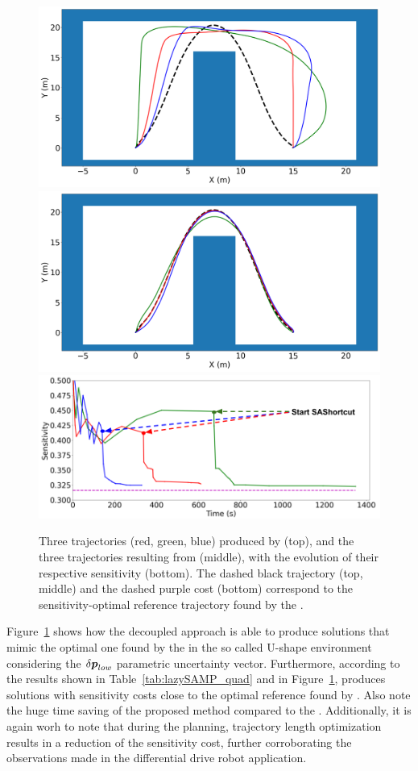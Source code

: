 \begin{figure}[h]
    \centering
    \includegraphics[width=0.7\linewidth]{figures/samp/U_shape_3in1_before.png}
    \includegraphics[width=0.7\linewidth]{figures/samp/U_shape_3in1_after.png}
    \includegraphics[width=0.7\linewidth]{figures/samp/U_shape_3in1_sensi.png}
    \caption{Three trajectories (red, green, blue) produced by  (top), and the three trajectories resulting from  (middle), with the evolution of their respective sensitivity (bottom). 
    The dashed black trajectory (top, middle) and the dashed purple cost (bottom) correspond to the sensitivity-optimal reference trajectory found by the .}
    \label{fig:U_shape}
\end{figure}

Figure~\ref{fig:U_shape} shows how the decoupled approach is able to produce solutions that mimic the optimal one found by the  in the so called U-shape environment considering the $\delta\boldsymbol{p}_{low}$ parametric uncertainty vector.
Furthermore, according to the results shown in Table~\ref{tab:lazySAMP_quad} and in Figure~\ref{fig:U_shape},  produces solutions with sensitivity costs close to the optimal reference found by . 
Also note the huge time saving of the proposed method compared to the .
Additionally, it is again worh to note that during the  planning, trajectory length optimization results in a reduction of the sensitivity cost, further corroborating the observations made in the differential drive robot application.

